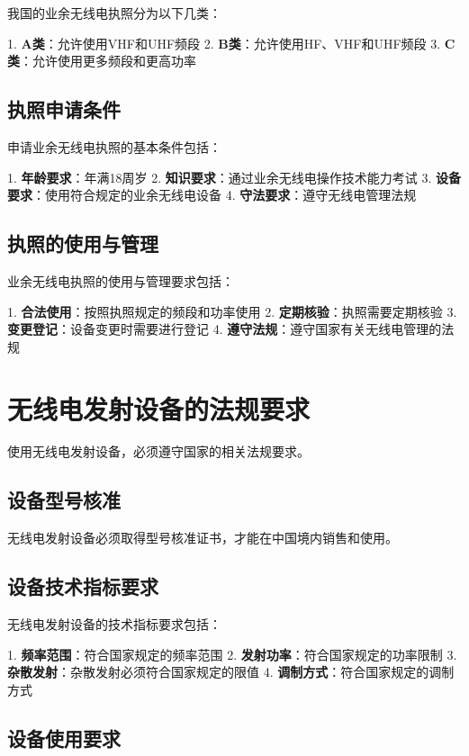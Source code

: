 \documentclass[12pt,UTF8]{ctexbook}
\begin{document}
我国的业余无线电执照分为以下几类：

1. \textbf{A类}：允许使用VHF和UHF频段
2. \textbf{B类}：允许使用HF、VHF和UHF频段
3. \textbf{C类}：允许使用更多频段和更高功率

\section{执照申请条件}

申请业余无线电执照的基本条件包括：

1. \textbf{年龄要求}：年满18周岁
2. \textbf{知识要求}：通过业余无线电操作技术能力考试
3. \textbf{设备要求}：使用符合规定的业余无线电设备
4. \textbf{守法要求}：遵守无线电管理法规

\section{执照的使用与管理}

业余无线电执照的使用与管理要求包括：

1. \textbf{合法使用}：按照执照规定的频段和功率使用
2. \textbf{定期核验}：执照需要定期核验
3. \textbf{变更登记}：设备变更时需要进行登记
4. \textbf{遵守法规}：遵守国家有关无线电管理的法规

\chapter{无线电发射设备的法规要求}

使用无线电发射设备，必须遵守国家的相关法规要求。

\section{设备型号核准}

无线电发射设备必须取得型号核准证书，才能在中国境内销售和使用。

\section{设备技术指标要求}

无线电发射设备的技术指标要求包括：

1. \textbf{频率范围}：符合国家规定的频率范围
2. \textbf{发射功率}：符合国家规定的功率限制
3. \textbf{杂散发射}：杂散发射必须符合国家规定的限值
4. \textbf{调制方式}：符合国家规定的调制方式

\section{设备使用要求}
\end{document}
